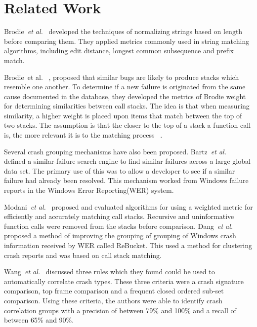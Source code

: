 \documentclass{sig-alternate}
\begin{document}
\section{Related Work}
\label{sec: relatedwork}

Brodie~\emph{et al.}~\cite{Brodie2} developed the techniques of normalizing strings based on length before comparing them. They applied metrics commonly used in string matching algorithms, including edit distance, longest common subsequence and prefix match.

Brodie~et al. ~\cite{raey}, proposed that similar bugs are likely to produce stacks which resemble one another. To determine if a new failure is originated from the same cause documented in the database, they developed the metrics of Brodie weight for determining similarities between call stacks. The idea is that when measuring similarity, a higher weight is placed upon items that match between the top of two stacks. The assumption is that the closer to the top of a stack a function call is, the more relevant it is to the matching process ~\cite{Brodie2}.

Several crash grouping mechanisms have also been proposed. Bartz~\emph{et al.}~\cite{Bartz:2008:FSF:1855895.1855896} defined a similar-failure search engine to find similar failures across a large global data set. The primary use of this was to allow a developer to see if a similar failure had already been resolved. This mechanism worked from Windows failure reports in the Windows Error Reporting(WER) system.

Modani~\emph{et al.}~\cite{4401026} proposed and evaluated algorithms for using a weighted metric for efficiently and accurately matching call stacks. Recursive and uninformative function calls were removed from the stacks before comparison. Dang~\emph{et al.}~ \cite{Dang:2012:RMC:2337223.2337364} proposed a method of improving the grouping of grouping of Windows crash information received by WER called ReBucket. This used a method for clustering crash reports and was based on call stack matching. 

Wang~\emph{et al.}~\cite{Wang:2013:IBL:2487085.2487135} discussed three rules which they found could be used to automatically correlate crash types. These three criteria were a crash signature comparison, top frame comparison and a frequent closed ordered sub-set comparison. Using these criteria, the authors were able to identify crash correlation groups with a precision of between 79\% and 100\% and a recall of between 65\% and 90\%. 
\end{document}
